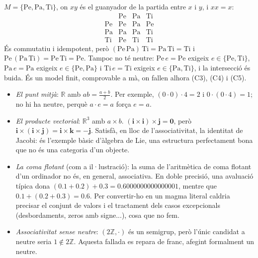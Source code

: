 \begin{exemple}\label{ex:ppt}
$M=\{\mathrm{Pe},\mathrm{Pa},\mathrm{Ti}\}$, on $xy$ és el guanyador de la partida entre $x$ i $y$, i $xx=x$:
\[
\begin{array}{c|ccc}
 & \mathrm{Pe} & \mathrm{Pa} & \mathrm{Ti}\\\hline
\mathrm{Pe} & \mathrm{Pe} & \mathrm{Pa} & \mathrm{Pe}\\
\mathrm{Pa} & \mathrm{Pa} & \mathrm{Pa} & \mathrm{Ti}\\
\mathrm{Ti} & \mathrm{Pe} & \mathrm{Ti} & \mathrm{Ti}
\end{array}
\]
És commutatiu i idempotent, però $(\mathrm{Pe}\,\mathrm{Pa})\,\mathrm{Ti}=\mathrm{Pa}\,\mathrm{Ti}=\mathrm{Ti}$ i $\mathrm{Pe}\,(\mathrm{Pa}\,\mathrm{Ti})=\mathrm{Pe}\,\mathrm{Ti}=\mathrm{Pe}$. Tampoc no té neutre: $\mathrm{Pe}\,e=\mathrm{Pe}$ exigeix $e\in\{\mathrm{Pe},\mathrm{Ti}\}$, $\mathrm{Pa}\,e=\mathrm{Pa}$ exigeix $e\in\{\mathrm{Pe},\mathrm{Pa}\}$ i $\mathrm{Ti}\,e=\mathrm{Ti}$ exigeix $e\in\{\mathrm{Pa},\mathrm{Ti}\}$, i la intersecció és buida. És un model finit, comprovable a mà, on fallen alhora (C3), (C4) i (C5).
\end{exemple}

\begin{exemple}
\begin{itemize}
\item \emph{El punt mitjà}: $\mathbb R$ amb $ab=\frac{a+b}2$. Per exemple, $(0\cdot0)\cdot4=2$ i $0\cdot(0\cdot4)=1$; no hi ha neutre, perquè $a\cdot e=a$ força $e=a$.
\item \emph{El producte vectorial}: $\mathbb R^3$ amb $a\times b$. $(\mathbf i\times\mathbf i)\times\mathbf j=\mathbf 0$, però $\mathbf i\times(\mathbf i\times\mathbf j)=\mathbf i\times\mathbf k=-\mathbf j$. Satisfà, en lloc de l'associativitat, la identitat de Jacobi: és l'exemple bàsic d'àlgebra de Lie, una estructura perfectament bona que no és una categoria d'un objecte.
\item \emph{La coma flotant} (com a il·lustració): la suma de l'aritmètica de coma flotant d'un ordinador no és, en general, associativa. En doble precisió, una avaluació típica dona $(0.1+0.2)+0.3=0.6000000000000001$, mentre que $0.1+(0.2+0.3)=0.6$. Per convertir-ho en un magma literal caldria precisar el conjunt de valors i el tractament dels casos excepcionals (desbordaments, zeros amb signe...), cosa que no fem.
\item \emph{Associativitat sense neutre}: $(2\mathbb Z,\cdot)$ és un semigrup, però l'únic candidat a neutre seria $1\notin2\mathbb Z$. Aquesta fallada es repara de franc, afegint formalment un neutre.
\end{itemize}
\end{exemple}

